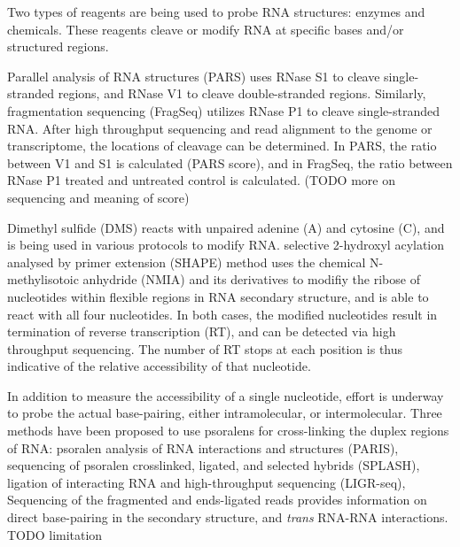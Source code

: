 \documentclass{proposal}
\begin{document}
Two types of reagents are being used to probe RNA structures: enzymes and chemicals.
These reagents cleave or modify RNA at specific bases and/or structured regions.

﻿Parallel analysis of RNA structures (PARS)\cite{wan2014landscape}
﻿uses RNase S1 to cleave single-stranded regions, and RNase V1 to cleave double-stranded regions.
Similarly, ﻿fragmentation sequencing (FragSeq)\cite{underwood2010fragseq} utilizes ﻿RNase P1 to cleave single-stranded RNA.
After high throughput sequencing and read alignment to the genome or transcriptome,
the locations of cleavage can be determined.
In PARS, the ratio between V1 and S1 is calculated (PARS score),
and in FragSeq, the ratio between ﻿RNase P1 treated and untreated control is calculated. (TODO more on sequencing and meaning of score)


﻿Dimethyl sulfide (DMS) reacts with ﻿unpaired adenine (A) and cytosine (C),
and is being used in various protocols to modify RNA\cite{rouskin2014genome, talkish2014mod}.
﻿selective 2-hydroxyl acylation analysed by primer extension (SHAPE)
method uses the chemical N-methylisotoic anhydride (NMIA) and its derivatives to
modifiy the ribose of nucleotides within flexible regions in RNA secondary structure,
and is able to react with all four nucleotides.
In both cases, the modified nucleotides result in ﻿termination of reverse transcription (RT),
and can be detected via high throughput sequencing.
The number of RT stops at each position is thus indicative of the relative accessibility of that nucleotide.

In addition to measure the accessibility of a single nucleotide,
effort is underway to probe the actual base-pairing, either intramolecular, or intermolecular.
Three methods have been proposed to use psoralens for cross-linking the duplex regions of RNA:
psoralen analysis of RNA interactions and structures (PARIS)\cite{lu2018paris},
sequencing of psoralen crosslinked, ligated, and selected hybrids (SPLASH)\cite{aw2016vivo},
ligation of interacting RNA and high-throughput sequencing (LIGR-seq)\cite{sharma2016global},
Sequencing of the fragmented and ends-ligated reads provides information on direct base-pairing in the secondary structure,
and \textit{trans} RNA-RNA interactions.
TODO limitation
\end{document}
